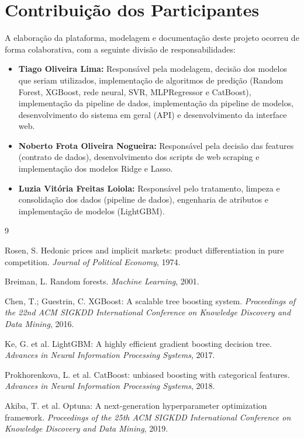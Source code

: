 \documentclass[12pt,a4paper]{article}
\begin{document}
\section{Contribuição dos Participantes}

A elaboração da plataforma, modelagem e documentação deste projeto ocorreu de forma colaborativa, com a seguinte divisão de responsabilidades:

\begin{itemize}
    \item \textbf{Tiago Oliveira Lima:} Responsável pela modelagem, decisão dos modelos que seriam utilizados, implementação de algoritmos de predição (Random Forest, XGBoost, rede neural, SVR, MLPRegressor e CatBoost), implementação da pipeline de dados, implementação da pipeline de modelos, desenvolvimento do sistema em geral (API) e desenvolvimento da interface web.
    \item \textbf{Noberto Frota Oliveira Nogueira:} Responsável pela decisão das features (contrato de dados), desenvolvimento dos scripts de web scraping e implementação dos modelos Ridge e Lasso.
    \item \textbf{Luzia Vitória Freitas Loiola:} Responsável pelo tratamento, limpeza e consolidação dos dados (pipeline de dados), engenharia de atributos e implementação de modelos (LightGBM).
\end{itemize}

\begin{thebibliography}{9}

Rosen, S. Hedonic prices and implicit markets: product differentiation in pure competition. \textit{Journal of Political Economy}, 1974.

Breiman, L. Random forests. \textit{Machine Learning}, 2001.

Chen, T.; Guestrin, C. XGBoost: A scalable tree boosting system. \textit{Proceedings of the 22nd ACM SIGKDD International Conference on Knowledge Discovery and Data Mining}, 2016.

Ke, G. et al. LightGBM: A highly efficient gradient boosting decision tree. \textit{Advances in Neural Information Processing Systems}, 2017.

Prokhorenkova, L. et al. CatBoost: unbiased boosting with categorical features. \textit{Advances in Neural Information Processing Systems}, 2018.

Akiba, T. et al. Optuna: A next-generation hyperparameter optimization framework. \textit{Proceedings of the 25th ACM SIGKDD International Conference on Knowledge Discovery and Data Mining}, 2019.

\end{thebibliography}
\end{document}
